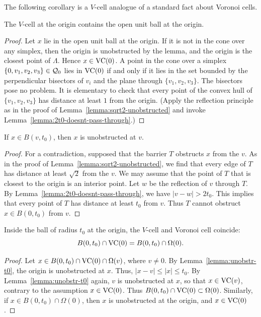 The following corollary is a $V$-cell analogue of a standard fact
about Voronoi cells.

\begin{corollary}
The $V$-cell at the origin contains the open unit ball at the
origin.
\end{corollary}

\begin{proof}  Let $x$ lie in the open unit ball at the origin.  If it is not in
the cone over any simplex, then the origin is unobstructed by the
lemma, and the origin is the closest point of $\Lambda$. Hence
$x\in{\operatorname{VC}}(0)$.  A point in the cone over a simplex
$\{0,v_1,v_2,v_3\}\in{\mathcal Q}_0$ lies in ${\operatorname{VC}}(0)$ if and only if
it lies in the set bounded by the perpendicular bisectors of $v_i$
and the plane through $\{v_1,v_2,v_3\}$.  The bisectors pose no
problem. It is elementary to check that every point of the convex
hull of $\{v_1,v_2,v_3\}$ has distance at least $1$ from the origin.
(Apply the reflection principle as in the proof of
Lemma~\ref{lemma:sqrt2-unobstructed} and invoke
Lemma~\ref{lemma:2t0-doesnt-pass-through}.)
\end{proof}

\begin{lemma}\label{lemma:unobstr-t0}
If $x\in B(v,t_0)$, then $x$ is unobstructed at $v$.
\end{lemma}

\begin{proof}   For a contradiction, supposed that the barrier $T$
obstructs $x$ from the $v$.  As in the proof of
Lemma~\ref{lemma:sqrt2-unobstructed}, we find that every edge of
$T$ has distance at least $\sqrt2$ from the $v$.  We may assume
that the point of $T$ that is closest to the origin is an interior
point.  Let $w$ be the reflection of $v$ through $T$.  By
Lemma~\ref{lemma:2t0-doesnt-pass-through}, we have $|v-w|>2t_0$.
This implies that every point of $T$ has distance at least $t_0$
from $v$.  Thus $T$ cannot obstruct $x\in B(0,t_0)$ from $v$.
\end{proof}

\begin{lemma}\label{lemma:VC-Omega}
Inside the ball of radius $t_0$ at the origin, the $V$-cell and
Voronoi cell coincide:
   $$B(0,t_0)\cap {\operatorname{VC}}(0) = B(0,t_0)\cap \Omega(0).$$
\end{lemma}

\begin{proof} Let $x\in B(0,t_0)\cap {\operatorname{VC}}(0)\cap\Omega(v)$, where
$v\ne0$.  By Lemma~\ref{lemma:unobstr-t0}, the origin is
unobstructed at $x$.  Thus, $|x-v|\le |x|\le t_0$.  By
Lemma~\ref{lemma:unobstr-t0} again, $v$ is unobstructed at $x$, so
that $x\in {\operatorname{VC}}(v)$, contrary to the assumption
$x\in{\operatorname{VC}}(0)$.  Thus $B(0,t_0)\cap{\operatorname{VC}}(0)\subset\Omega(0)$.
Similarly, if $x\in B(0,t_0)\cap \Omega(0)$, then $x$ is
unobstructed at the origin, and $x\in {\operatorname{VC}}(0)$.
\end{proof}

